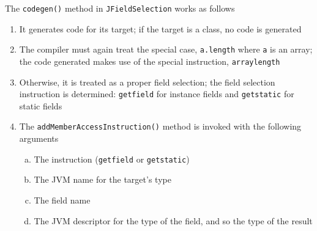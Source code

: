 \documentclass[8pt,a4paper,compress]{beamer}
\begin{document}
\begin{frame}[fragile]
\pause

The \lstinline{codegen()} method in \lstinline{JFieldSelection} works as follows
\begin{enumerate}
\pause
\item It generates code for its target; if the target is a class, no code is generated
\pause
\item The compiler must again treat the special case, \lstinline{a.length} where \lstinline{a} is an array; the code generated makes use of the special instruction, \lstinline{arraylength}
\pause
\item Otherwise, it is treated as a proper field selection; the field selection instruction is determined: \lstinline{getfield} for instance fields and \lstinline{getstatic} for static fields
\pause
\item The \lstinline{addMemberAccessInstruction()} method is invoked with the following arguments
\begin{enumerate}[(a)]
\pause
\item The instruction (\lstinline{getfield} or \lstinline{getstatic})
\pause
\item The JVM name for the target's type
\pause
\item The field name
\pause
\item The JVM descriptor for the type of the field, and so the type of the result
\end{enumerate}
\end{enumerate}
\end{frame}
\end{document}
